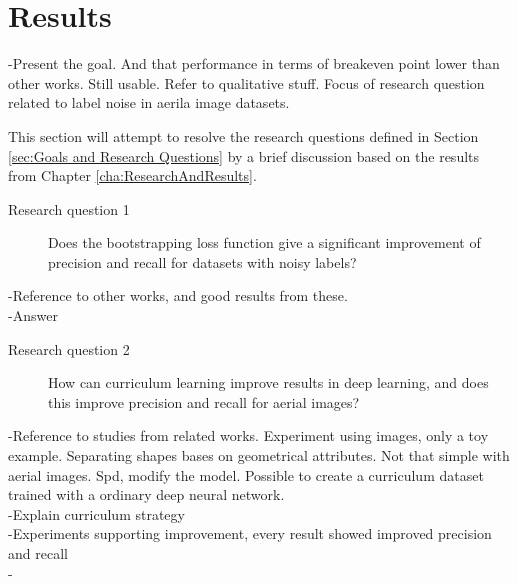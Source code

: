 \section{Results}
\label{sec:SummaryDiscussion}

-Present the goal. And that performance in terms of breakeven point lower than other works.
Still usable. Refer to qualitative stuff.
Focus of research question related to label noise in aerila image datasets. 
 
 This section will attempt to resolve the research questions defined in Section \ref{sec:Goals and Research Questions} by a brief discussion based on the results from Chapter \ref{cha:ResearchAndResults}.
\begin{description}
\item[Research question 1] Does the bootstrapping loss function give a significant improvement of precision and recall for datasets with noisy labels?
\end{description}

-Reference to other works, and good results from these.\\
-Answer\\


\begin{description}
\item[Research question 2]  How can curriculum learning improve results in deep learning, and does this improve precision and recall for aerial images?
\end{description}

-Reference to studies from related works. Experiment using images, only a toy example. Separating shapes bases on geometrical attributes. Not that simple with aerial images. Spd, modify the model. Possible to create a curriculum dataset trained with a ordinary deep neural network.\\
-Explain curriculum strategy\\
-Experiments supporting improvement, every result showed improved precision and recall\\
-

